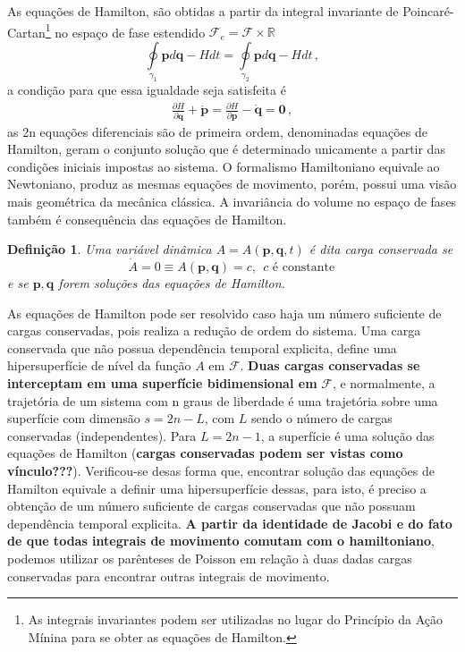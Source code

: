 \documentclass[25pt]{article}
\numberwithin{equation}{subsection} %
\newtheorem{defi}{Definição}
\begin{document}
As equações de Hamilton, são obtidas a partir da integral invariante de Poincaré-Cartan\footnote{As integrais invariantes podem ser utilizadas no lugar do Princípio da Ação Mínina para se obter as equações de Hamilton.} no espaço de fase estendido $\mathcal{F}_{e}=\mathcal{F}\times\mathbb{R}$
\begin{displaymath}
\oint\limits_{\gamma_1}\mathbf{p}d\mathbf{q}-Hdt=\oint\limits_{\gamma_2}\mathbf{p}d\mathbf{q}-Hdt\,,
\end{displaymath}
a condição para que essa igualdade seja satisfeita é
\begin{align}
\frac{\partial H}{\partial \mathbf{q}}+\dot{\mathbf{p}}=\frac{\partial H}{\partial \mathbf{p}}-\dot{\mathbf{q}}=\mathbf{0}\,,
\end{align}
as 2n equações diferenciais são de primeira ordem, denominadas equações de Hamilton, geram o conjunto solução que é determinado unicamente a partir das condições iniciais impostas ao sistema. O formalismo Hamiltoniano equivale ao Newtoniano, produz as mesmas equações de movimento, porém, possui uma visão mais geométrica da mecânica clássica.
\bigbreak
A invariância do volume no espaço de fases também é consequência das equações de Hamilton.
\begin{defi}
	Uma variável dinâmica $A=A\left(\mathbf{p},\mathbf{q},t\right)$ é dita carga conservada se $$\dot{A}=0\equiv A\left(\mathbf{p},\mathbf{q}\right)=c,~~c\text{ é constante}\,$$ e se $\mathbf{p},\mathbf{q}$ forem soluções das equações de Hamilton.
\end{defi}
\bigbreak
As equações de Hamilton pode ser resolvido caso haja um número suficiente de cargas conservadas, pois realiza a redução de ordem do sistema.
\bigbreak
Uma carga conservada que não possua dependência temporal explicita, define uma hipersuperfície de nível da função $A$ em $\mathcal{F}$. \textbf{Duas cargas conservadas se interceptam em uma superfície bidimensional em }$\mathcal{F}$, e normalmente, a trajetória de um sistema com n graus de liberdade é uma trajetória sobre uma superfície com dimensão $s=2n-L$, com $L$ sendo o número de cargas conservadas (independentes). Para $L=2n-1$, a superfície é uma solução das equações de Hamilton (\textbf{cargas conservadas podem ser vistas como vínculo???}).
\bigbreak
Verificou-se desas forma que, encontrar solução das equações de Hamilton equivale a definir uma hipersuperfície dessas, para isto, é preciso a obtenção de um número suficiente de cargas conservadas que não possuam dependência temporal explicita.
\textbf{A partir da identidade de Jacobi e do fato de que todas integrais de movimento comutam com o hamiltoniano}, podemos utilizar os parênteses de Poisson em relação à duas dadas cargas conservadas para encontrar outras integrais de movimento.
\end{document}
